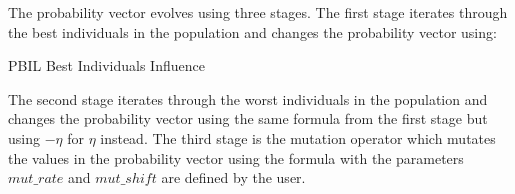 \documentclass{article}
\begin{document}
\noindent The probability vector evolves using three stages. The first stage iterates through the best individuals in the population and changes the probability vector using: \par 
\begin{algorithm}
	\caption{PBIL Best Individuals Influence}
	\begin{algorithmic}
		\EndFor
	\end{algorithmic}
\end{algorithm}
The second stage iterates through the worst individuals in the population and changes the probability vector using the same formula from the first stage but using $-\eta$ for $\eta$ instead. The third stage is the mutation operator which mutates the values in the probability vector using the formula with the parameters $mut\_rate$ and $mut\_shift$ are defined by the user. \par
\end{document}
